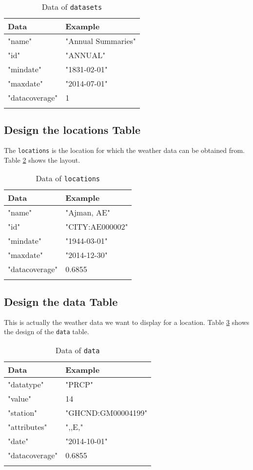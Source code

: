 \documentclass[10pt, a4paper]{article}
\begin{document}
\begin{table}[h]\footnotesize
  \caption{Data of \texttt{datasets}}
  \begin{tabular}{p{5cm} p{7cm}}
    \hline
    \textbf{Data} & \textbf{Example} \\
    \hline
    "name"         & "Annual Summaries" \\
    "id"           & "ANNUAL" \\
    "mindate"      & "1831-02-01" \\
    "maxdate"      & "2014-07-01" \\
    "datacoverage" & 1 \\
    \hline
    \label{tbl:datasetsdata}
  \end{tabular}
\end{table}

\subsection{Design the locations Table}
The \texttt{locations} is the location for which the weather data can be 
obtained from. Table \ref{tbl:locationsdata} shows the layout.

\begin{table}[h]\footnotesize
  \caption{Data of \texttt{locations}}
  \begin{tabular}{p{5cm} p{7cm}}
    \hline
    \textbf{Data} & \textbf{Example} \\
    \hline
    "name"         & "Ajman, AE" \\
    "id"           & "CITY:AE000002" \\
    "mindate"      & "1944-03-01" \\
    "maxdate"      & "2014-12-30" \\
    "datacoverage" & 0.6855 \\
    \hline
    \label{tbl:locationsdata}
  \end{tabular}
\end{table}

\subsection{Design the data Table}
This is actually the weather data we want to display for a location. Table
\ref{tbl:datadata} shows the design of the \texttt{data} table.

\begin{table}[h]\footnotesize
  \caption{Data of \texttt{data}}
  \begin{tabular}{p{5cm} p{7cm}}
    \hline
    \textbf{Data} & \textbf{Example} \\
    \hline
    "datatype"   & "PRCP" \\
    "value"      & 14 \\
    "station"    & "GHCND:GM00004199" \\
    "attributes" & ",,E," \\
    "date"       & "2014-10-01" \\
    "datacoverage" & 0.6855 \\
    \hline
    \label{tbl:datadata}
  \end{tabular}
\end{table}
\end{document}
